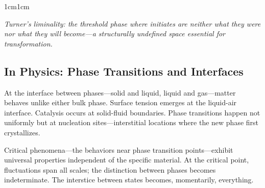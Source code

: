\documentclass[../main.tex]{subfiles}
\begin{document}
\begin{adjustwidth}{1cm}{1cm}
\begin{center}

\small\textit{Turner's liminality: the threshold phase where initiates are neither what they were nor what they will become---a structurally undefined space essential for transformation.}\normalsize
\end{center}

\vspace{0.5cm}

\subsection*{In Physics: Phase Transitions and Interfaces}

At the interface between phases---solid and liquid, liquid and gas---matter behaves unlike either bulk phase. Surface tension emerges at the liquid-air interface. Catalysis occurs at solid-fluid boundaries. Phase transitions happen not uniformly but at nucleation sites---interstitial locations where the new phase first crystallizes.

Critical phenomena---the behaviors near phase transition points---exhibit universal properties independent of the specific material. At the critical point, fluctuations span all scales; the distinction between phases becomes indeterminate. The interstice between states becomes, momentarily, everything.


\end{adjustwidth}
\end{document}
